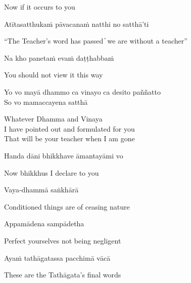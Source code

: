 \begin{cprenglish}
Now if it occurs to you
\end{cprenglish}

Atītasatthukaṁ pāvacanaṁ natthi no satthā’ti

\begin{cprenglish}
“The Teacher’s word has passed  ̓  we are without a teacher”
\end{cprenglish}

Na kho panetaṁ evaṁ daṭṭhabbaṁ

\begin{cprenglish}
You should not view it this way
\end{cprenglish}

Yo vo mayā dhammo ca vinayo ca desito paññatto\\
So vo mamaccayena satthā

\begin{cprenglish}
Whatever Dhamma and Vinaya\\
I have pointed out and formulated for you\\
That will be your teacher when I am gone
\end{cprenglish}

Handa dāni bhikkhave āmantayāmi vo

\begin{cprenglish}
Now bhikkhus I declare to you
\end{cprenglish}

Vaya-dhammā saṅkhārā

\begin{cprenglish}
Conditioned things are of ceasing nature
\end{cprenglish}

Appamādena sampādetha

\begin{cprenglish}
Perfect yourselves not being negligent
\end{cprenglish}

Ayaṁ tathāgatassa pacchimā vācā

\begin{cprenglish}
These are the Tathāgata’s final words
\end{cprenglish}


\clearpage
